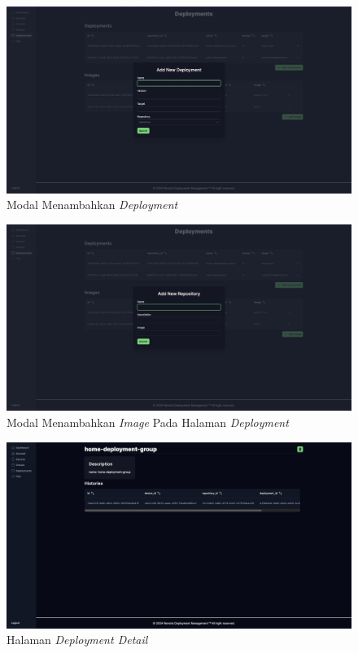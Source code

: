 \begin{figure}[ht]
  \centering
  \includegraphics[width=1\textwidth]{resources/chapter-4/dashboard/deployment-page-add-deployment.jpg}
  \caption{Modal Menambahkan \textit{Deployment}}
  \label{fig:halaman-deployment-add-deployment}
\end{figure}

\begin{figure}[ht]
  \centering
  \includegraphics[width=1\textwidth]{resources/chapter-4/dashboard/deployment-page-add-repostory.jpg}
  \caption{Modal Menambahkan \textit{Image} Pada Halaman \textit{Deployment}}
  \label{fig:halaman-deployment-add-repostory}
\end{figure}

\begin{figure}[ht]
  \centering
  \includegraphics[width=1\textwidth]{resources/chapter-4/dashboard/deployment-detail-page.jpg}
  \caption{Halaman \textit{Deployment Detail}}
  \label{fig:halaman-deployment-detail}
\end{figure}

